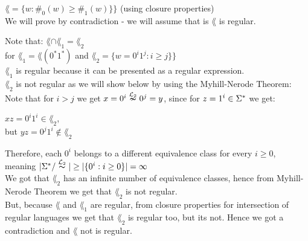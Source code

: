 $\lang=\{w : \#_0(w) \geq \#_1(w)\}\}$ (using closure properties) \\
We will prove by contradiction - we will assume that is $\lang$ is regular.

Note that: $\lang \cap \lang_1 = \lang_2$ \\
for $\lang_1 = \lang(0^*1^*) $ and $\lang_2 = \{w = 0^i1^j : i \geq j\}\}$ \\
$\lang_1$ is regular because it can be presented as a regular expression. \\
$\lang_2$ is not regular as we will show below by using the Myhill-Nerode Theorem: \\

Note that for $i > j$ we get $x = 0^i \overset{\mathcal{L}_2}{\nsim} 0^j = y$,
since for $z=1^i \in \Sigma^*$ we get:

$xz = 0^i 1^i \in \lang_2$, \\
but $yz = 0^j 1^i \notin \lang_2$

Therefore, each $ 0^i $ belongs to a different equivalence class for every $i \geq 0$, \\
meaning $|\Sigma^* / \overset{\mathcal{L}_2}{\thicksim}| \geq |\{0^i: i \geq 0\}| = \infty$ \\
We got that $\lang_2$ has an infinite number of equivalence classes, hence from
Myhill-Nerode Theorem we get that $\lang_2$ is not regular. \\

But, because $\lang$ and $\lang_1$ are regular, from closure properties
for intersection of regular languages we get that $\lang_2$ is regular too, but its not.
Hence we got a contradiction and $\lang$ not is regular. \\
